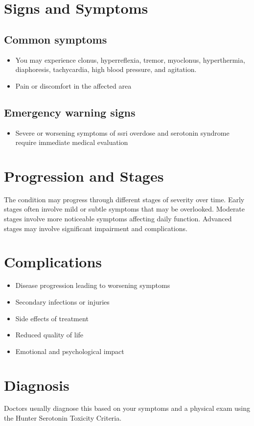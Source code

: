 \section{Signs and Symptoms}

\subsection{Common symptoms}
\begin{itemize}[noitemsep]
  \item You may experience clonus, hyperreflexia, tremor, myoclonus, hyperthermia, diaphoresis, tachycardia, high blood pressure, and agitation.

  \item Pain or discomfort in the affected area
  \end{itemize}

\subsection{Emergency warning signs}
\begin{itemize}[noitemsep]
  \item Severe or worsening symptoms of ssri overdose and serotonin syndrome require immediate medical evaluation
\end{itemize}
\section{Progression and Stages}
The condition may progress through different stages of severity over time. Early stages often involve mild or subtle symptoms that may be overlooked. Moderate stages involve more noticeable symptoms affecting daily function. Advanced stages may involve significant impairment and complications.
\section{Complications}
\begin{itemize}[noitemsep]
  \item Disease progression leading to worsening symptoms
  \item Secondary infections or injuries
  \item Side effects of treatment
  \item Reduced quality of life
  \item Emotional and psychological impact
\end{itemize}
\section{Diagnosis}
Doctors usually diagnose this based on your symptoms and a physical exam using the Hunter Serotonin Toxicity Criteria.

